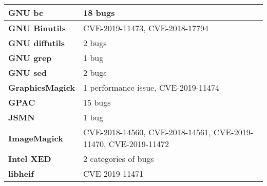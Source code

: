 \begin{longtable}{| p{} | p{} |}
\textbf{GNU bc}         & 18 bugs                                                                                                                                                                                            \\ \hline
\textbf{GNU Binutils}   & CVE-2019-11473, CVE-2018-17794
	\\ \hline
\textbf{GNU diffutils}  & 2 bugs                                                                                                                                                                                             \\ \hline
\textbf{GNU grep}       & 1 bug                                                                                                                                                                                              \\ \hline
\textbf{GNU sed}        & 2 bugs                                                                                                                                                                                             \\ \hline
\textbf{GraphicsMagick} & 1 performance issue, CVE-2019-11474                                                                                                                                                                     \\ \hline
\textbf{GPAC}           & 15 bugs                                                                                                                                                                                            \\ \hline
\textbf{JSMN}           & 1 bug                                                                                                                                                                                              \\ \hline
\textbf{ImageMagick}    & CVE-2018-14560, CVE-2018-14561, CVE-2019-11470, CVE-2019-11472                                                                                                                                                             \\ \hline
\textbf{Intel XED}      & 2 categories of bugs                                                                                                                                                                               \\ \hline
\textbf{libheif}                 & CVE-2019-11471

\end{longtable}
